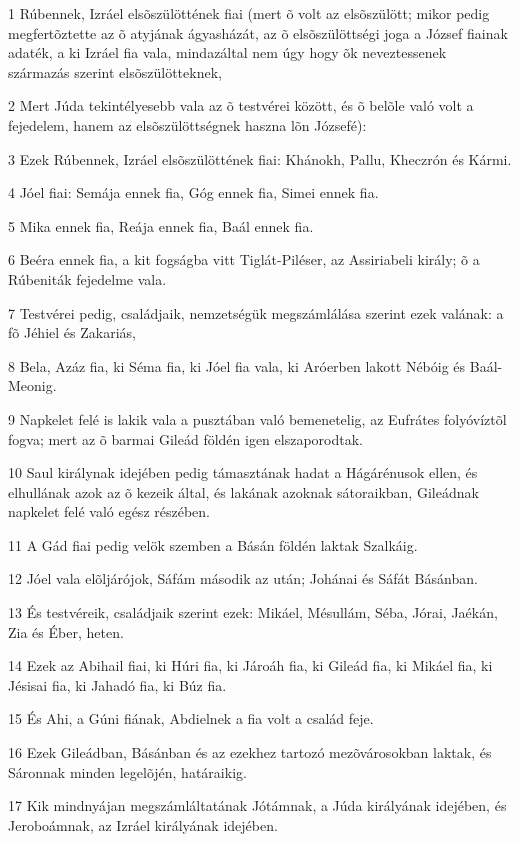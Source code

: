 \par 1 Rúbennek, Izráel elsõszülöttének fiai (mert õ volt az elsõszülött; mikor pedig megfertõztette az õ atyjának ágyasházát, az õ elsõszülöttségi joga a József fiainak adaték, a ki Izráel fia vala, mindazáltal nem úgy hogy õk neveztessenek származás szerint elsõszülötteknek,
\par 2 Mert Júda tekintélyesebb vala az õ testvérei között, és õ belõle való volt a fejedelem, hanem az elsõszülöttségnek haszna lõn Józsefé):
\par 3 Ezek Rúbennek, Izráel elsõszülöttének fiai: Khánokh, Pallu, Kheczrón és Kármi.
\par 4 Jóel fiai: Semája ennek fia, Góg ennek fia, Simei ennek fia.
\par 5 Mika ennek fia, Reája ennek fia, Baál ennek fia.
\par 6 Beéra ennek fia, a kit fogságba vitt Tiglát-Piléser, az Assiriabeli király; õ a Rúbeniták fejedelme vala.
\par 7 Testvérei pedig, családjaik, nemzetségük megszámlálása szerint ezek valának: a fõ Jéhiel és Zakariás,
\par 8 Bela, Azáz fia, ki Séma fia, ki Jóel fia vala, ki Aróerben lakott Nébóig és Baál-Meonig.
\par 9 Napkelet felé is lakik vala a pusztában való bemenetelig, az Eufrátes folyóvíztõl fogva; mert az õ barmai Gileád földén igen elszaporodtak.
\par 10 Saul királynak idejében pedig támasztának hadat a Hágárénusok ellen, és elhullának azok az õ kezeik által, és lakának azoknak sátoraikban, Gileádnak napkelet felé való egész részében.
\par 11 A Gád fiai pedig velök szemben a Básán földén laktak Szalkáig.
\par 12 Jóel vala elõljárójok, Sáfám második az után; Johánai és Sáfát Básánban.
\par 13 És testvéreik, családjaik szerint ezek: Mikáel, Mésullám, Séba, Jórai, Jaékán, Zia és Éber, heten.
\par 14 Ezek az Abihail fiai, ki Húri fia, ki Jároáh fia, ki Gileád fia, ki Mikáel fia, ki Jésisai fia, ki Jahadó fia, ki Búz fia.
\par 15 És Ahi, a Gúni fiának, Abdielnek a fia volt a család feje.
\par 16 Ezek Gileádban, Básánban és az ezekhez tartozó mezõvárosokban laktak, és Sáronnak minden legelõjén, határaikig.
\par 17 Kik mindnyájan megszámláltatának Jótámnak, a Júda királyának idejében, és Jeroboámnak,  az Izráel királyának idejében.
